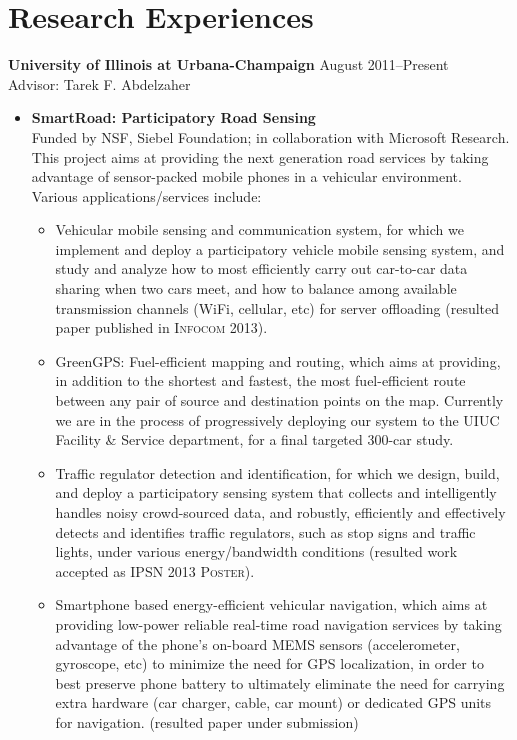 \section{\sc Research Experiences}
{\bf University of Illinois at Urbana-Champaign} \hfill August 2011--Present\\
Advisor: Tarek F. Abdelzaher
\begin{itemize}
\item \textbf{SmartRoad: Participatory Road Sensing} \\ Funded by NSF,
  Siebel Foundation; in collaboration with Microsoft Research. This
  project aims at providing the next generation road services by
  taking advantage of sensor-packed mobile phones in a vehicular
  environment. Various applications/services include:
\begin{itemize}
\item Vehicular mobile sensing and communication system, for which we
  implement and deploy a participatory vehicle mobile sensing system,
  and study and analyze how to most efficiently carry out car-to-car
  data sharing when two cars meet, and how to balance among available
  transmission channels (WiFi, cellular, etc) for server offloading
  (resulted paper published in \textsc{Infocom 2013}).

\item GreenGPS: Fuel-efficient mapping and routing, which aims at
  providing, in addition to the shortest and fastest, the most
  fuel-efficient route between any pair of source and destination
  points on the map. Currently we are in the process of progressively
  deploying our system to the UIUC Facility \& Service department, for
  a final targeted 300-car study.

\item Traffic regulator detection and identification, for which we
  design, build, and deploy a participatory sensing system that
  collects and intelligently handles noisy crowd-sourced data, and
  robustly, efficiently and effectively detects and identifies traffic
  regulators, such as stop signs and traffic lights, under various
  energy/bandwidth conditions (resulted work accepted as \textsc{IPSN
    2013 Poster}).

\item Smartphone based energy-efficient vehicular navigation, which
  aims at providing low-power reliable real-time road navigation
  services by taking advantage of the phone's on-board MEMS sensors
  (accelerometer, gyroscope, etc) to minimize the need for GPS
  localization, in order to best preserve phone battery to ultimately
  eliminate the need for carrying extra hardware (car charger, cable,
  car mount) or dedicated GPS units for navigation. (resulted paper
  under submission)
\end{itemize}


\end{itemize}
